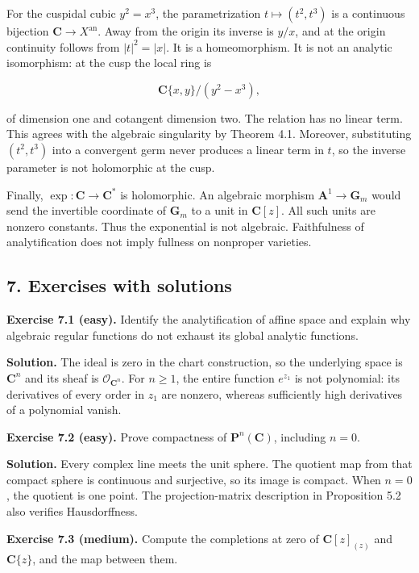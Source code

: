 \documentclass[11pt]{article}
\begin{document}
For the cuspidal cubic \(y^2=x^3\), the parametrization
\(t\mapsto(t^2,t^3)\) is a continuous bijection
\(\mathbf C\to X^{\mathrm{an}}\). Away from the origin its inverse is
\(y/x\), and at the origin continuity follows from \(|t|^2=|x|\). It is
a homeomorphism. It is not an analytic isomorphism: at the cusp the
local ring is

\[
\mathbf C\{x,y\}/(y^2-x^3),
\]

of dimension one and cotangent dimension two. The relation has no linear
term. This agrees with the algebraic singularity by Theorem 4.1.
Moreover, substituting \((t^2,t^3)\) into a convergent germ never
produces a linear term in \(t\), so the inverse parameter is not
holomorphic at the cusp.

Finally, \(\exp:\mathbf C\to\mathbf C^*\) is holomorphic. An algebraic
morphism \(\mathbf A^1\to\mathbf G_m\) would send the invertible
coordinate of \(\mathbf G_m\) to a unit in \(\mathbf C[z]\). All such
units are nonzero constants. Thus the exponential is not algebraic.
Faithfulness of analytification does not imply fullness on nonproper
varieties.

\subsection{7. Exercises with solutions}\label{exercises-with-solutions}

\textbf{Exercise 7.1 (easy).} Identify the analytification of affine
space and explain why algebraic regular functions do not exhaust its
global analytic functions.

\textbf{Solution.} The ideal is zero in the chart construction, so the
underlying space is \(\mathbf C^n\) and its sheaf is
\(\mathcal O_{\mathbf C^n}\). For \(n\geq1\), the entire function
\(e^{z_1}\) is not polynomial: its derivatives of every order in \(z_1\)
are nonzero, whereas sufficiently high derivatives of a polynomial
vanish.

\textbf{Exercise 7.2 (easy).} Prove compactness of
\(\mathbf P^n(\mathbf C)\), including \(n=0\).

\textbf{Solution.} Every complex line meets the unit sphere. The
quotient map from that compact sphere is continuous and surjective, so
its image is compact. When \(n=0\), the quotient is one point. The
projection-matrix description in Proposition 5.2 also verifies
Hausdorffness.

\textbf{Exercise 7.3 (medium).} Compute the completions at zero of
\(\mathbf C[z]_{(z)}\) and \(\mathbf C\{z\}\), and the map between them.
\end{document}

